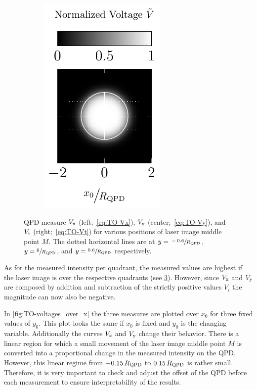 \begin{figure}
\begin{subfigure}[b]{0.3\textwidth}
    \label{fig:TO-QPDy}
  \end{subfigure}
  \hfill
  \begin{subfigure}[b]{0.3\textwidth}
    \centering
    \includegraphics[]{External/QPDt.pdf}
    \label{fig:TO-QPDt}
  \end{subfigure}
  \caption{QPD measure $V_{\mathrm{x}}$ (left;~\cref{eq:TO-Vx}), $V_{\mathrm{y}}$ 
    (center;~\cref{eq:TO-Vy}), and $V_{\mathrm{t}}$ (right;~\cref{eq:TO-Vt}) for 
    various positions of laser image middle point $M$. The dotted horizontal 
    lines are at $y=\sfrac{-0.6}{R_{\mathrm{QPD}}}$, $y=\sfrac{0}{R_{\mathrm{QPD}}}$, 
  and $y=\sfrac{0.6}{R_{\mathrm{QPD}}}$ respectively.}
  \label{fig:TO-QPDs}
 \end{figure}

As for the measured intensity per quadrant, the measured values are highest if 
the laser image is over the respective quadrants (see \cref{fig:TO-QPDs}). 
However, since $V_{\mathrm{x}}$ and $V_{\mathrm{y}}$ are composed by addition and 
subtraction of the strictly positive values $V_{i}$ the magnitude can now also 
be negative.

In \cref{fig:TO-voltages_over_x} the three measures are plotted over $x_{0}$ 
for three fixed values of $y_{0}$. This plot looks the same if $x_{0}$ is fixed 
and $y_{0}$ is the changing variable. Additionally the curves $V_{\mathrm{x}}$ and 
$V_{\mathrm{y}}$ change their behavior. There is a linear region for which a small 
movement of the laser image middle point $M$ is converted into a proportional 
change in the measured intensity on the QPD. However, this linear regime from 
$-0.15\,R_{\mathrm{QPD}}$ to $0.15\,R_{\mathrm{QPD}}$ is rather small. Therefore, it is 
very important to check and adjust the offset of the QPD before each 
measurement to ensure interpretability of the results.

